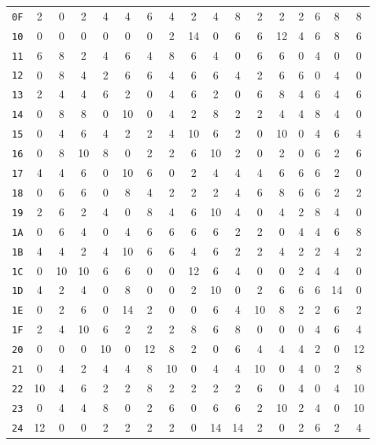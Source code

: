\begin{center}
\begin{small}
\begin{longtable}{c|cccccccccccccccc}
\texttt{0F} & 2 & 0 & 2 & 4 & 4 & 6 & 4 & 2 & 4 & 8 & 2 & 2 & 2 & 6 & 8 & 8 \\
\texttt{10} & 0 & 0 & 0 & 0 & 0 & 0 & 2 & 14 & 0 & 6 & 6 & 12 & 4 & 6 & 8 & 6 \\
\texttt{11} & 6 & 8 & 2 & 4 & 6 & 4 & 8 & 6 & 4 & 0 & 6 & 6 & 0 & 4 & 0 & 0 \\
\texttt{12} & 0 & 8 & 4 & 2 & 6 & 6 & 4 & 6 & 6 & 4 & 2 & 6 & 6 & 0 & 4 & 0 \\
\texttt{13} & 2 & 4 & 4 & 6 & 2 & 0 & 4 & 6 & 2 & 0 & 6 & 8 & 4 & 6 & 4 & 6 \\
\texttt{14} & 0 & 8 & 8 & 0 & 10 & 0 & 4 & 2 & 8 & 2 & 2 & 4 & 4 & 8 & 4 & 0 \\
\texttt{15} & 0 & 4 & 6 & 4 & 2 & 2 & 4 & 10 & 6 & 2 & 0 & 10 & 0 & 4 & 6 & 4 \\
\texttt{16} & 0 & 8 & 10 & 8 & 0 & 2 & 2 & 6 & 10 & 2 & 0 & 2 & 0 & 6 & 2 & 6 \\
\texttt{17} & 4 & 4 & 6 & 0 & 10 & 6 & 0 & 2 & 4 & 4 & 4 & 6 & 6 & 6 & 2 & 0 \\
\texttt{18} & 0 & 6 & 6 & 0 & 8 & 4 & 2 & 2 & 2 & 4 & 6 & 8 & 6 & 6 & 2 & 2 \\
\texttt{19} & 2 & 6 & 2 & 4 & 0 & 8 & 4 & 6 & 10 & 4 & 0 & 4 & 2 & 8 & 4 & 0 \\
\texttt{1A} & 0 & 6 & 4 & 0 & 4 & 6 & 6 & 6 & 6 & 2 & 2 & 0 & 4 & 4 & 6 & 8 \\
\texttt{1B} & 4 & 4 & 2 & 4 & 10 & 6 & 6 & 4 & 6 & 2 & 2 & 4 & 2 & 2 & 4 & 2 \\
\texttt{1C} & 0 & 10 & 10 & 6 & 6 & 0 & 0 & 12 & 6 & 4 & 0 & 0 & 2 & 4 & 4 & 0 \\
\texttt{1D} & 4 & 2 & 4 & 0 & 8 & 0 & 0 & 2 & 10 & 0 & 2 & 6 & 6 & 6 & 14 & 0 \\
\texttt{1E} & 0 & 2 & 6 & 0 & 14 & 2 & 0 & 0 & 6 & 4 & 10 & 8 & 2 & 2 & 6 & 2 \\
\texttt{1F} & 2 & 4 & 10 & 6 & 2 & 2 & 2 & 8 & 6 & 8 & 0 & 0 & 0 & 4 & 6 & 4 \\
\texttt{20} & 0 & 0 & 0 & 10 & 0 & 12 & 8 & 2 & 0 & 6 & 4 & 4 & 4 & 2 & 0 & 12 \\
\texttt{21} & 0 & 4 & 2 & 4 & 4 & 8 & 10 & 0 & 4 & 4 & 10 & 0 & 4 & 0 & 2 & 8 \\
\texttt{22} & 10 & 4 & 6 & 2 & 2 & 8 & 2 & 2 & 2 & 2 & 6 & 0 & 4 & 0 & 4 & 10 \\
\texttt{23} & 0 & 4 & 4 & 8 & 0 & 2 & 6 & 0 & 6 & 6 & 2 & 10 & 2 & 4 & 0 & 10 \\
\texttt{24} & 12 & 0 & 0 & 2 & 2 & 2 & 2 & 0 & 14 & 14 & 2 & 0 & 2 & 6 & 2 & 4 \\

\end{longtable}
\end{small}
\end{center}
